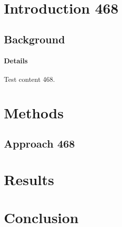 \documentclass{article}
\begin{document}
\section{Introduction 468}
\subsection{Background}
\paragraph{Details} Test content 468.
\section{Methods}
\subsection{Approach 468}
\section{Results}
\section{Conclusion}
\end{document}
